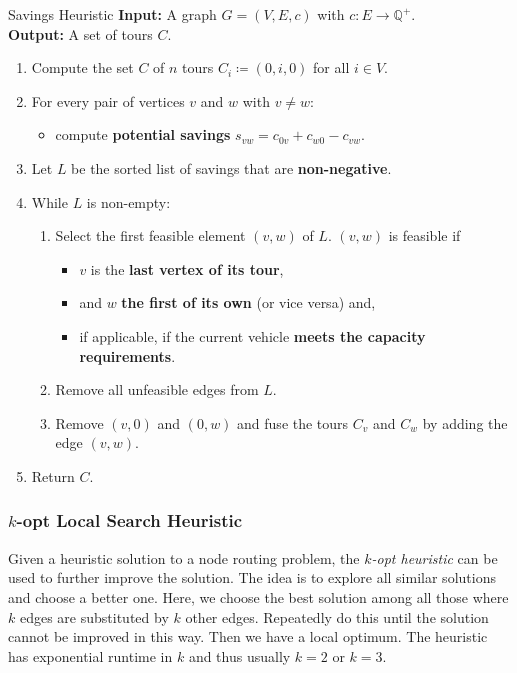 \documentclass[english]{panikzettel}
\begin{document}
\begin{algo}{Savings Heuristic}
\textbf{Input:} A graph $G = (V,E,c)$ with $c:E\to\mathbb{Q}^+$. \\
\textbf{Output:} A set of tours $C$.
\tcblower
\begin{enumerate}[nosep]
    \item Compute the set $C$ of $n$ tours $C_i \coloneqq (0,i,0)$ for all $i \in V$.
    \item For every pair of vertices $v$ and $w$ with $v \neq w$:
        \begin{itemize}
            \item compute \textbf{potential savings} $s_{vw} = c_{0v} + c_{w0} - c_{vw}$.
        \end{itemize}
    \item Let $L$ be the sorted list of savings that are \textbf{non-negative}.
    \item While $L$ is non-empty:
    \begin{enumerate}
        \item Select the first feasible element $(v,w)$ of $L$. $(v,w)$ is feasible if
            \begin{itemize}
                \item $v$ is the \textbf{last vertex of its tour},
                \item and $w$ \textbf{the first of its own} (or vice versa) and,
                \item if applicable, if the current vehicle \textbf{meets the capacity requirements}.
            \end{itemize}
        \item Remove all unfeasible edges from $L$.
        \item Remove $(v,0)$ and $(0,w)$ and fuse the tours $C_v$ and $C_w$ by adding the edge $(v,w)$.
    \end{enumerate}
    \item Return $C$.
\end{enumerate}
\end{algo}

\subsubsection[k-opt Local Search Heuristic]{$k$-opt Local Search Heuristic}

Given a heuristic solution to a node routing problem, the \emph{$k$-opt heuristic} can be used to further improve the solution.
The idea is to explore all similar solutions and choose a better one.
Here, we choose the best solution among all those where $k$ edges are substituted by $k$ other edges.
Repeatedly do this until the solution cannot be improved in this way.
Then we have a local optimum.
The heuristic has exponential runtime in $k$ and thus usually $k = 2$ or $k = 3$.
\end{document}
